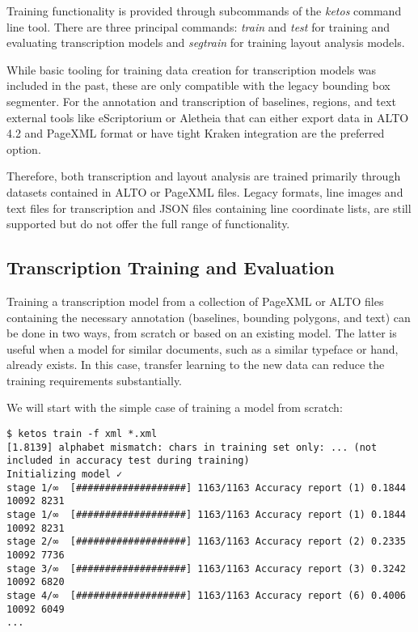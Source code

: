 Training functionality is provided through subcommands of the \emph{ketos}
command line tool. There are three principal commands: \emph{train} and
\emph{test} for training and evaluating transcription models and
\emph{segtrain} for training layout analysis models.

While basic tooling for training data creation for transcription models was
included in the past, these are only compatible with the legacy bounding box
segmenter. For the annotation and transcription of baselines, regions, and
text external tools like eScriptorium or Aletheia that can either export data
in ALTO 4.2 and  PageXML format or have tight Kraken integration are the
preferred option.

Therefore, both transcription and layout analysis are trained primarily through
datasets contained in ALTO or PageXML files. Legacy formats, line images and
text files for transcription and JSON files containing line coordinate lists,
are still supported but do not offer the full range of functionality.

\subsection{Transcription Training and Evaluation}

Training a transcription model from a collection of PageXML or ALTO files
containing the necessary annotation (baselines, bounding polygons, and text)
can be done in two ways, from scratch or based on an existing model. The latter
is useful when a model for similar documents, such as a similar typeface or
hand, already exists. In this case, transfer learning to the new data can
reduce the training requirements substantially.

We will start with the simple case of training a model from scratch:

\begin{verbatim}
$ ketos train -f xml *.xml
[1.8139] alphabet mismatch: chars in training set only: ... (not included in accuracy test during training)
Initializing model ✓
stage 1/∞  [###################] 1163/1163 Accuracy report (1) 0.1844 10092 8231
stage 1/∞  [###################] 1163/1163 Accuracy report (1) 0.1844 10092 8231
stage 2/∞  [###################] 1163/1163 Accuracy report (2) 0.2335 10092 7736
stage 3/∞  [###################] 1163/1163 Accuracy report (3) 0.3242 10092 6820
stage 4/∞  [###################] 1163/1163 Accuracy report (6) 0.4006 10092 6049
...
\end{verbatim}

